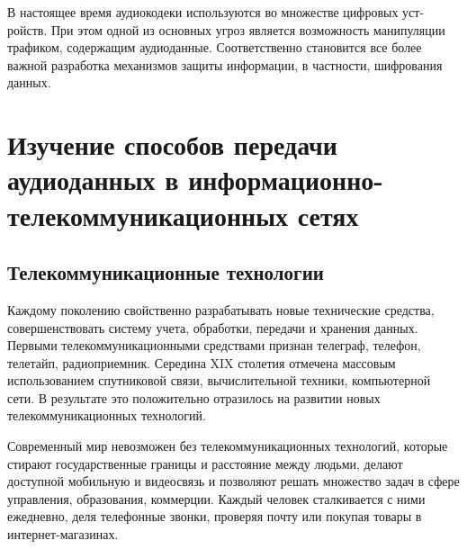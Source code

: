 \documentclass[a4paper]{report}
\begin{document}
В настоящее время аудиокодеки используются во множестве цифровых уст-\\ройств. При этом одной из основных угроз является возможность манипуляции трафиком, содержащим аудиоданные.
Соответственно становится все более важной разработка механизмов защиты информации, в частности, шифрования данных.

\chapter{Изучение способов передачи аудиоданных в информационно-телекоммуникационных сетях}
\section{Телекоммуникационные технологии}
Каждому поколению свойственно разрабатывать новые технические средства, совершенствовать систему учета, обработки, передачи и хранения данных. Первыми телекоммуникационными средствами признан телеграф, телефон, телетайп, радиоприемник. Середина XIX столетия отмечена массовым использованием спутниковой связи, вычислительной техники, компьютерной сети. В результате это положительно отразилось на развитии новых телекоммуникационных технологий.
\par Современный мир невозможен без телекоммуникационных технологий, которые стирают государственные границы и расстояние между людьми, делают доступной мобильную и видеосвязь и позволяют решать множество задач в сфере управления, образования, коммерции. Каждый человек сталкивается с ними ежедневно, деля телефонные звонки, проверяя почту или покупая товары в интернет-магазинах.
\end{document}

